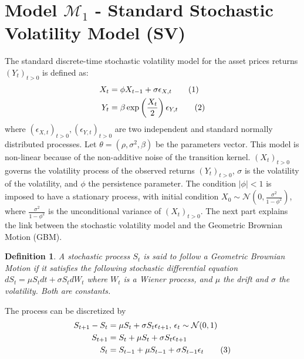 \documentclass[11pt,a4,twosided,singlespacing,titlepagenumber=on]{scrreprt}
\numberwithin{equation}{chapter} %
\newtheorem{definition}[theorem]{Definition}%
\theoremstyle{remark}
\newcommand\numberthis{\addtocounter{equation}{1}\tag{\theequation}}
\begin{document}
\section{Model $\mathcal{M}_1$ - Standard Stochastic Volatility Model (SV)}
The standard discrete-time stochastic volatility model for the asset prices returns $(Y_t)_{t>0}$ is defined as:
\begin{align*}
  X_t &=  \phi X_{t-1} + \sigma \epsilon_{X,t} \numberthis \label{std_SV_process_X} \\
  Y_t &=  \beta \exp \left( \frac{X_t}{2} \right) \epsilon_{Y,t} \numberthis
\end{align*}
where $(\epsilon_{X,t})_{t>0},(\epsilon_{Y,t})_{t>0}$ are two independent and standard normally distributed processes. Let $\theta = (\rho, \sigma^2, \beta)$ be the parameters vector. This model is non-linear because of the non-additive noise of the transition kernel. $(X_t)_{t>0}$ governs the volatility process of the observed returns $(Y_t)_{t>0}$, $\sigma$ is the volatility of the volatility, and $\phi$ the persistence parameter. The condition $|\phi| < 1$  is imposed to have a stationary process, with initial condition $X_0 \sim \mathcal{N} \left(0, \frac{\sigma^2}{1-\phi^2} \right)$, where $\frac{\sigma^2}{1-\phi^2}$ is the unconditional variance of $(X_t)_{t>0}$. The next part explains the link between the stochastic volatility model and the Geometric Brownian Motion (GBM).

\begin{definition}
\textit{
A stochastic process $S_t$ is said to follow a Geometric Brownian Motion if it satisfies the following stochastic differential equation
$dS_t = \mu S_t dt + \sigma S_t dW_t$
where $W_t$ is a Wiener process, and $\mu$ the drift and $\sigma$ the volatility. Both are constants.}
\end{definition}


The process can be discretized by
\begin{align*}
S_{t+1}-S_t &= \mu S_t + \sigma S_t \epsilon_{t+1} \text{, } \epsilon_{t} \sim \mathcal{N}(0,1) \\
S_{t+1} 	&= S_t + \mu S_t + \sigma S_t \epsilon_{t+1} \\
S_t 	&= S_{t-1} + \mu S_{t-1} + \sigma S_{t-1} \epsilon_t \numberthis
\end{align*}
\end{document}
